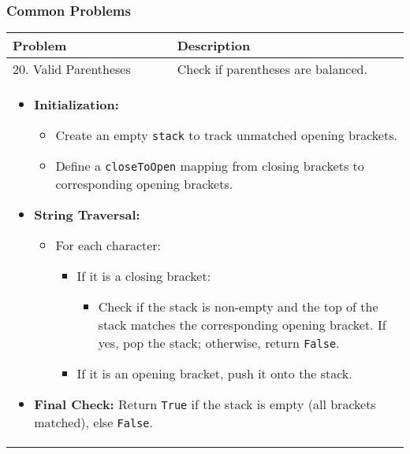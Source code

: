 \subsubsection{Common Problems}
\begin{summary}
    \begin{center}
        \begin{tabular}{ll}
            \toprule
            \textbf{Problem} & \textbf{Description} \\
            \midrule
            20. Valid Parentheses & Check if parentheses are balanced. \\
            \multicolumn{2}{p{\linewidth}}{
                \begin{itemize}
                    \item \textbf{Initialization:}
                    \begin{itemize}
                        \item Create an empty \texttt{stack} to track unmatched opening brackets.
                        \item Define a \texttt{closeToOpen} mapping from closing brackets to corresponding opening brackets.
                    \end{itemize}
                
                    \item \textbf{String Traversal:}
                    \begin{itemize}
                        \item For each character:
                        \begin{itemize}
                            \item If it is a closing bracket:
                            \begin{itemize}
                                \item Check if the stack is non-empty and the top of the stack matches the corresponding opening bracket. If yes, pop the stack; otherwise, return \texttt{False}.
                            \end{itemize}
                            \item If it is an opening bracket, push it onto the stack.
                        \end{itemize}
                    \end{itemize}
                
                    \item \textbf{Final Check:} Return \texttt{True} if the stack is empty (all brackets matched), else \texttt{False}.
                

\end{itemize}}
\end{tabular}
\end{center}
\end{summary}
